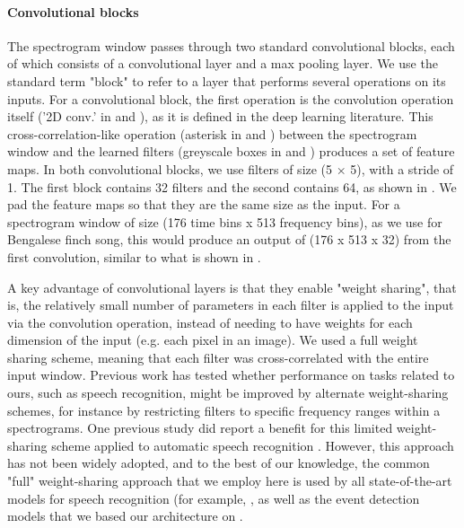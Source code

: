\documentclass[9pt,lineno]{elife}
\begin{document}
\paragraph{Convolutional blocks}
The spectrogram window passes through two standard convolutional blocks, 
each of which consists of a convolutional layer and a max pooling layer. 
We use the standard term "block" to refer to a layer
that performs several operations on its inputs.  
For a convolutional block, the first operation
is the convolution operation itself 
('2D conv.' in  and ), 
as it is defined in the deep learning literature. 
This cross-correlation-like operation 
(asterisk in  and ) 
between the spectrogram window and the learned filters 
(greyscale boxes in  and ) 
produces a set of feature maps.
In both convolutional blocks, we use filters of size (5 $\times$ 5), 
with a stride of 1.
The first block contains 32 filters and the second contains 64, 
as shown in . 
We pad the feature maps so that they are the same size as the input. 
For a spectrogram window of size (176 time bins x 513 frequency bins), 
as we use for Bengalese finch song, 
this would produce an output of (176 x 513 x 32) from the first convolution, 
similar to what is shown in .

A key advantage of convolutional layers is that they enable "weight sharing", that is, 
the relatively small number of parameters in each filter is applied to the input 
via the convolution operation, instead of needing to have weights for each dimension 
of the input (e.g. each pixel in an image). We used a full weight sharing scheme, 
meaning that each filter was cross-correlated with the entire input window. 
Previous work has tested whether performance on tasks related to ours, 
such as speech recognition, might be improved by alternate weight-sharing schemes, 
for instance by restricting filters to specific frequency ranges within a spectrograms. 
One previous study did report a benefit for this limited weight-sharing scheme 
applied to automatic speech recognition \citep{abdel2014convolutional}. 
However, this approach has not been widely adopted, and to the best of our knowledge, 
the common "full" weight-sharing approach that we employ here is used by 
all state-of-the-art models for speech recognition (for example, \citep{amodei2016deep}, 
as well as the event detection models that we based our architecture on 
\citep{parascandolo_recurrent_2016, lea2017temporal}.
\end{document}
